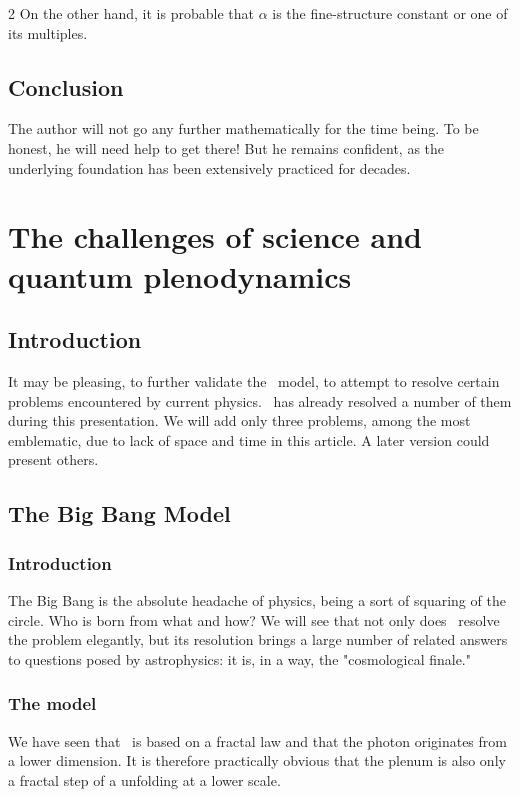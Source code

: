 \begin{multicols}{2}
	On the other hand, it is probable that $\alpha$ is the fine-structure constant or one of its multiples.
	
	\subsection{Conclusion}
	
	The author will not go any further mathematically for the time being. To be honest, he will need help to get there! But he remains confident, as the underlying foundation has been extensively practiced for decades.
	
	\section{The challenges of science and quantum plenodynamics}
	
	\subsection{Introduction}
	
	It may be pleasing, to further validate the \PQ\ model, to attempt to resolve certain problems encountered by current physics. \PQ\ has already resolved a number of them during this presentation. We will add only three problems, among the most emblematic, due to lack of space and time in this article. A later version could present others.
	
	\subsection{The Big Bang Model}
	
	\subsubsection{Introduction}
	
	The Big Bang is the absolute headache of physics, being a sort of squaring of the circle. Who is born from what and how? We will see that not only does \PQ\ resolve the problem elegantly, but its resolution brings a large number of related answers to questions posed by astrophysics: it is, in a way, the "cosmological finale."
	
	\subsubsection{The model}
	
	We have seen that \PQ\ is based on a fractal law and that the photon originates from a lower dimension. It is therefore practically obvious that the plenum is also only a fractal step of a unfolding at a lower scale.
	

\end{multicols}
